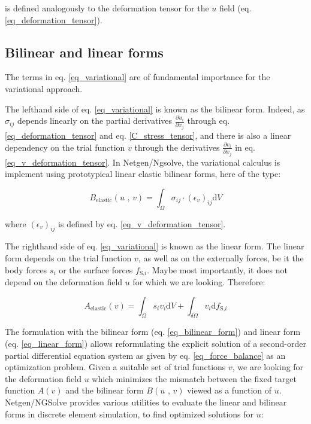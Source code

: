 \documentclass[11pt]{amsart}
\begin{document}
is defined analogously to the deformation tensor for the $u$ field (eq. \ref{eq_deformation_tensor}).

\subsection{Bilinear and linear forms}

The terms in eq. \ref{eq_variational} are of fundamental importance for the variational approach.

The lefthand side of eq. \ref{eq_variational} is known as the bilinear form\cite{berbatov_guide_2021,schoberl_example_nodate,arnold_appendix_nodate}. Indeed, as $\sigma_{ij}$ depends linearly on the partial derivatives $\frac{\partial u_i}{\partial x_j}$ through eq. \ref{eq_deformation_tensor} and eq. \ref{C_stress_tensor}, and there is also a linear dependency on the trial function $v$ through the derivatives $\frac{\partial v_i}{\partial x_j}$ in eq. \ref{eq_v_deformation_tensor}. In Netgen/Ngsolve\cite{gangl_fully_2020}, the variational calculus is implement using prototypical linear elastic bilinear forms, here of the type:

 \begin{equation}
B_\text{elastic}\left(u\text{ , }v\right)= \int_\Omega \sigma_{ij} \cdot \left(\epsilon_v\right)_{ij} \text{d}V \label{eq_bilinear_form}
 \end{equation}
 
 where $\left(\epsilon_v\right)_{ij}$ is defined by eq. \ref{eq_v_deformation_tensor}.
 
 The righthand side of eq. \ref{eq_variational} is known as the linear form\cite{arnold_appendix_nodate}. The linear form depends on the trial function $v$, as well as on the externally forces, be it the body forces $s_i$ or the  surface forces $f_{\text{S,}i}$. Maybe most importantly, it does not depend on the deformation field $u$ for which we are looking. Therefore:
 
  \begin{equation}
A_\text{elastic}\left(v\right)=\int_\Omega s_i v_i \text{d}V+\int_{\delta\Omega} v_i\text{d}f_{\text{S,}i} \label{eq_linear_form}
 \end{equation}
 
 
 The formulation with the bilinear form (eq. \ref{eq_bilinear_form}) and linear form (eq. \ref{eq_linear_form}) allows reformulating the explicit solution of a second-order partial differential equation system as given by eq. \ref{eq_force_balance} as an optimization problem. Given a suitable set of trial functions $v$, we are looking for the deformation field $u$ which minimizes the mismatch between the fixed target function $A\left(v\right)$ and the bilinear form $B\left(u\text{ , }v\right)$ viewed as a function of $u$. Netgen/NGSolve\cite{gangl_fully_2020} provides various utilities to evaluate the linear and bilinear forms in discrete element simulation, to find optimized solutions for $u$:
 
\end{document}
